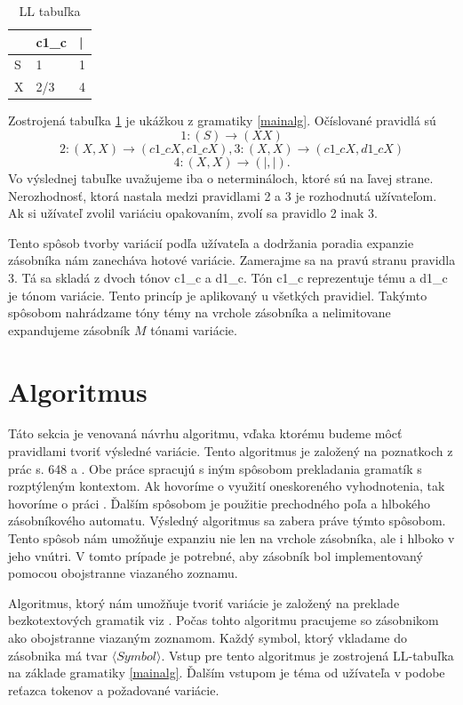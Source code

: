\begin{table}[!ht]
\label{tabulLL}
\centering
\begin{tabular}{|l|l|l|}
\hline
  & c1\_c & | \\ \hline
S & 1     & 1 \\ \hline
X & 2/3   & 4\\ \hline
\end{tabular}
\caption{LL tabuľka}
\end{table}

Zostrojená tabuľka \ref{tabulLL} je ukážkou z gramatiky \ref{mainalg}. Očíslované pravidlá sú $$1: (S) \rightarrow (XX)$$$$2: (X,X) \rightarrow (c1\_cX, c1\_cX),3: (X,X) \rightarrow (c1\_cX, d1\_cX)$$$$4:(X,X) \rightarrow (|,|).$$ Vo výslednej tabuľke uvažujeme iba o netermináloch, ktoré sú na ľavej strane. Nerozhodnosť, ktorá nastala medzi pravidlami 2 a 3 je rozhodnutá užívateľom. Ak si užívateľ zvolil variáciu opakovaním, zvolí sa pravidlo 2 inak 3.

Tento spôsob tvorby variácií podľa užívateľa a dodržania poradia expanzie zásobníka nám zanecháva hotové variácie. Zamerajme sa na pravú stranu pravidla 3. Tá sa skladá z dvoch tónov c1\_c a d1\_c. Tón c1\_c reprezentuje tému a d1\_c je tónom variácie. Tento princíp je aplikovaný u všetkých pravidiel. Takýmto spôsobom nahrádzame tóny témy na vrchole zásobníka a nelimitovane expandujeme zásobník $M$ tónami variácie.

\section{Algoritmus}
\label{sec:alg}
Táto sekcia je venovaná návrhu algoritmu, vďaka ktorému budeme môcť pravidlami tvoriť výsledné variácie. Tento algoritmus je založený na poznatkoch z prác s. 648 \cite{FITPUB10498} a \cite{tablemusic}. Obe práce spracujú s iným spôsobom prekladania gramatík s rozptýleným kontextom. Ak hovoríme o využití oneskoreného vyhodnotenia, tak hovoríme o práci \cite{tablemusic}. Ďalším spôsobom je použitie prechodného poľa a hlbokého zásobníkového automatu. Výsledný algoritmus sa zabera práve týmto spôsobom.
Tento spôsob nám umožňuje expanziu nie len na vrchole zásobníka, ale i hlboko v jeho vnútri. V tomto prípade je potrebné, aby zásobník bol implementovaný pomocou obojstranne viazaného zoznamu.

Algoritmus, ktorý nám umožňuje tvoriť variácie je založený na preklade bezkotextových gramatik viz \cite{FITPUB10524}. Počas tohto algoritmu pracujeme so zásobnikom ako obojstranne viazaným zoznamom. Každý symbol, ktorý vkladame do zásobnika má tvar $ \langle Symbol \rangle $. Vstup pre tento algoritmus je zostrojená LL-tabuľka na základe gramatiky \ref{mainalg}. Ďalším vstupom je téma od užívateľa v podobe reťazca tokenov a požadované variácie.

